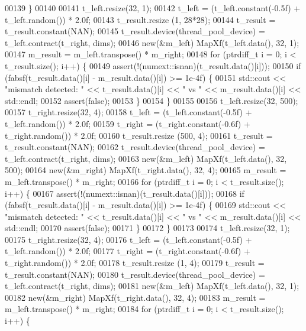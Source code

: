 \begin{DoxyCode}
00139   \}
00140 
00141   t\_left.resize(32, 1);
00142   t\_left = (t\_left.constant(-0.5f) + t\_left.random()) * 2.0f;
00143   t\_result.resize (1, 28*28);
00144   t\_result = t\_result.constant(NAN);
00145   t\_result.device(thread\_pool\_device) = t\_left.contract(t\_right, dims);
00146   \textcolor{keyword}{new}(&m\_left) MapXf(t\_left.data(), 32, 1);
00147   m\_result = m\_left.transpose() * m\_right;
00148   \textcolor{keywordflow}{for} (ptrdiff\_t i = 0; i < t\_result.size(); i++) \{
00149     assert(!(numext::isnan)(t\_result.data()[i]));
00150     \textcolor{keywordflow}{if} (fabsf(t\_result.data()[i] - m\_result.data()[i]) >= 1e-4f) \{
00151       std::cout << \textcolor{stringliteral}{"mismatch detected: "} << t\_result.data()[i] << \textcolor{stringliteral}{" vs "} <<  m\_result.data()[i] << 
      std::endl;
00152       assert(\textcolor{keyword}{false});
00153     \}
00154   \}
00155 
00156   t\_left.resize(32, 500);
00157   t\_right.resize(32, 4);
00158   t\_left = (t\_left.constant(-0.5f) + t\_left.random()) * 2.0f;
00159   t\_right = (t\_right.constant(-0.6f) + t\_right.random()) * 2.0f;
00160   t\_result.resize (500, 4);
00161   t\_result = t\_result.constant(NAN);
00162   t\_result.device(thread\_pool\_device) = t\_left.contract(t\_right, dims);
00163   \textcolor{keyword}{new}(&m\_left) MapXf(t\_left.data(), 32, 500);
00164   \textcolor{keyword}{new}(&m\_right) MapXf(t\_right.data(), 32, 4);
00165   m\_result = m\_left.transpose() * m\_right;
00166   \textcolor{keywordflow}{for} (ptrdiff\_t i = 0; i < t\_result.size(); i++) \{
00167     assert(!(numext::isnan)(t\_result.data()[i]));
00168     \textcolor{keywordflow}{if} (fabsf(t\_result.data()[i] - m\_result.data()[i]) >= 1e-4f) \{
00169       std::cout << \textcolor{stringliteral}{"mismatch detected: "} << t\_result.data()[i] << \textcolor{stringliteral}{" vs "} <<  m\_result.data()[i] << 
      std::endl;
00170       assert(\textcolor{keyword}{false});
00171     \}
00172   \}
00173 
00174   t\_left.resize(32, 1);
00175   t\_right.resize(32, 4);
00176   t\_left = (t\_left.constant(-0.5f) + t\_left.random()) * 2.0f;
00177   t\_right = (t\_right.constant(-0.6f) + t\_right.random()) * 2.0f;
00178   t\_result.resize (1, 4);
00179   t\_result = t\_result.constant(NAN);
00180   t\_result.device(thread\_pool\_device) = t\_left.contract(t\_right, dims);
00181   \textcolor{keyword}{new}(&m\_left) MapXf(t\_left.data(), 32, 1);
00182   \textcolor{keyword}{new}(&m\_right) MapXf(t\_right.data(), 32, 4);
00183   m\_result = m\_left.transpose() * m\_right;
00184   \textcolor{keywordflow}{for} (ptrdiff\_t i = 0; i < t\_result.size(); i++) \{

\end{DoxyCode}
